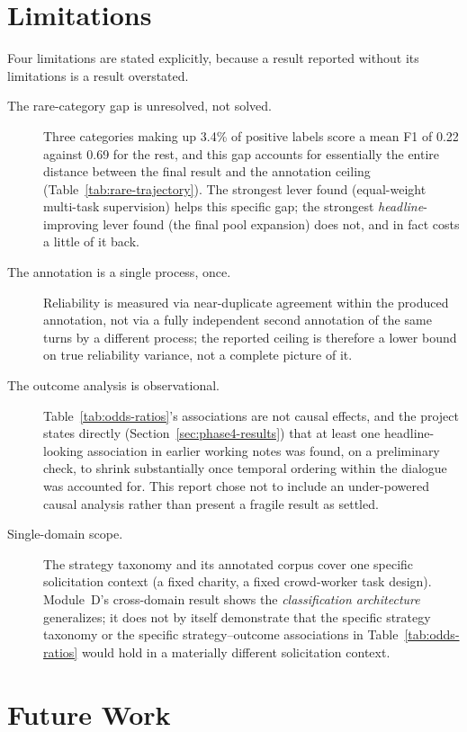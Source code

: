 \section{Limitations}

Four limitations are stated explicitly, because a result reported without
its limitations is a result overstated.

\begin{description}
\item[The rare-category gap is unresolved, not solved.] Three categories
  making up 3.4\% of positive labels score a mean F1 of 0.22 against 0.69
  for the rest, and this gap accounts for essentially the entire distance
  between the final result and the annotation ceiling
  (Table~\ref{tab:rare-trajectory}). The strongest lever found
  (equal-weight multi-task supervision) helps this specific gap; the
  strongest \emph{headline}-improving lever found (the final pool expansion)
  does not, and in fact costs a little of it back.
\item[The annotation is a single process, once.] Reliability is measured via
  near-duplicate agreement within the produced annotation, not via a fully
  independent second annotation of the same turns by a different process;
  the reported ceiling is therefore a lower bound on true reliability
  variance, not a complete picture of it.
\item[The outcome analysis is observational.] Table~\ref{tab:odds-ratios}'s
  associations are not causal effects, and the project states directly
  (Section~\ref{sec:phase4-results}) that at least one headline-looking
  association in earlier working notes was found, on a preliminary check,
  to shrink substantially once temporal ordering within the dialogue was
  accounted for. This report chose not to include an under-powered causal
  analysis rather than present a fragile result as settled.
\item[Single-domain scope.] The strategy taxonomy and its annotated corpus
  cover one specific solicitation context (a fixed charity, a fixed
  crowd-worker task design). Module~D's cross-domain result shows the
  \emph{classification architecture} generalizes; it does not by itself
  demonstrate that the specific strategy taxonomy or the specific
  strategy--outcome associations in Table~\ref{tab:odds-ratios} would hold
  in a materially different solicitation context.
\end{description}

\section{Future Work}
\label{sec:future-work}

